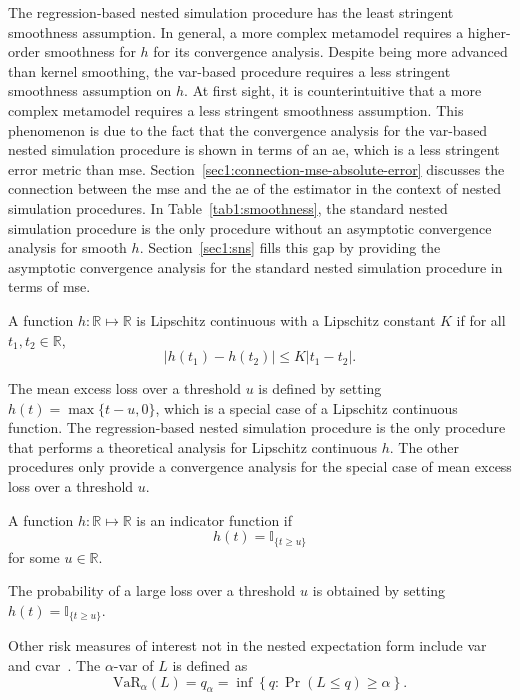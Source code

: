The regression-based nested simulation procedure has the least stringent smoothness assumption.
In general, a more complex metamodel requires a higher-order smoothness for $h$ for its convergence analysis.
Despite being more advanced than kernel smoothing, the \gls{var}-based procedure requires a less stringent smoothness assumption on $h$.
At first sight, it is counterintuitive that a more complex metamodel requires a less stringent smoothness assumption.
This phenomenon is due to the fact that the convergence analysis for the \gls{var}-based nested simulation procedure is shown in terms of an \gls{ae}, which is a less stringent error metric than \gls{mse}.
Section~\ref{sec1:connection-mse-absolute-error} discusses the connection between the \gls{mse} and the \gls{ae} of the estimator in the context of nested simulation procedures.
In Table~\ref{tab1:smoothness}, the standard nested simulation procedure is the only procedure without an asymptotic convergence analysis for smooth $h$.
Section~\ref{sec1:sns} fills this gap by providing the asymptotic convergence analysis for the standard nested simulation procedure in terms of \gls{mse}.

\begin{definition}\label{def1:lipschitz}
    A function $h: \mathbb{R} \mapsto \mathbb{R}$ is Lipschitz continuous with a Lipschitz constant $K$ if for all $t_1, t_2 \in \mathbb{R}$, 
    $$|h(t_1) - h(t_2)| \leq K|t_1 - t_2|.$$
\end{definition}

The mean excess loss over a threshold $u$ is defined by setting $h(t) = \max\{t - u, 0\}$, which is a special case of a Lipschitz continuous function.
The regression-based nested simulation procedure is the only procedure that performs a theoretical analysis for Lipschitz continuous $h$.
The other procedures only provide a convergence analysis for the special case of mean excess loss over a threshold $u$.

\begin{definition}\label{def1:indicator}
    A function $h: \mathbb{R} \mapsto \mathbb{R}$ is an indicator function if 
    $$h(t) = \mathbb{I}_{\{t \geq u\}}$$
    for some $u \in \mathbb{R}$.
\end{definition}

The probability of a large loss over a threshold $u$ is obtained by setting $h(t) = \mathbb{I}_{\{t \geq u\}}$.

Other risk measures of interest not in the nested expectation form include \gls{var} and \gls{cvar}~\citep{hardy2022quantitative}. 
The $\alpha$-\gls{var} of $L$ is defined as
\begin{equation}\label{eq1:var}
    \mbox{VaR}_\alpha(L) = q_\alpha = \inf \left\{ q: \Pr(L\leq q) \geq \alpha \right\}.
\end{equation}
    
